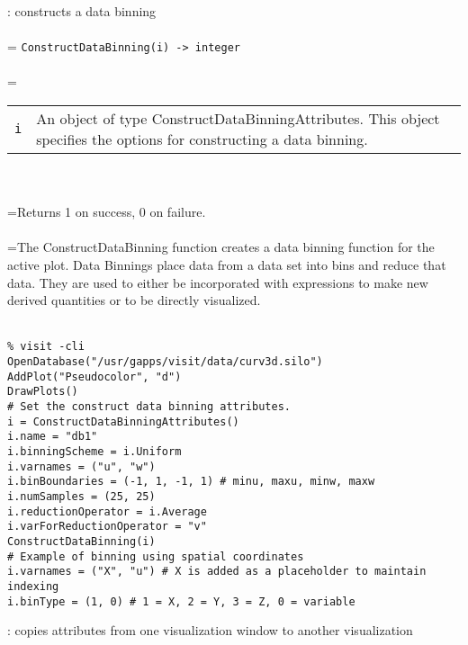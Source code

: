 \documentclass[10pt,a4paper]{report}
\begin{document}
{}
: constructs a data binning\\[-3mm]

 \\ 
\hangindent=\parindent 
\verb!ConstructDataBinning(i) -> integer!\\ [-3mm]

 \\ 
\hangindent=\parindent 
\begin{tabular}{lp{9cm}}
\verb!i! & An object of type ConstructDataBinningAttributes. This object specifies the options for constructing a data binning. \\
\end{tabular} \\[-2mm]


 \\ 
\hangindent=\parindent Returns 1 on success, 0 on failure. \\[-3mm] 

 \\ 
\hangindent=\parindent The ConstructDataBinning function creates a data binning function for the active plot. Data Binnings place data from a data set into bins and reduce that data. They are used to either be incorporated with expressions to make new derived quantities or to be directly visualized. \\[-3mm] 

\\[-6mm]
\begin{verbatim}% visit -cli
OpenDatabase("/usr/gapps/visit/data/curv3d.silo")
AddPlot("Pseudocolor", "d")
DrawPlots()
# Set the construct data binning attributes.
i = ConstructDataBinningAttributes()
i.name = "db1"
i.binningScheme = i.Uniform
i.varnames = ("u", "w")
i.binBoundaries = (-1, 1, -1, 1) # minu, maxu, minw, maxw
i.numSamples = (25, 25)
i.reductionOperator = i.Average
i.varForReductionOperator = "v"
ConstructDataBinning(i)
# Example of binning using spatial coordinates
i.varnames = ("X", "u") # X is added as a placeholder to maintain indexing
i.binType = (1, 0) # 1 = X, 2 = Y, 3 = Z, 0 = variable
\end{verbatim}
\newpage


{}
: copies attributes from one visualization window to another visualization\\[-3mm]
\end{document}
